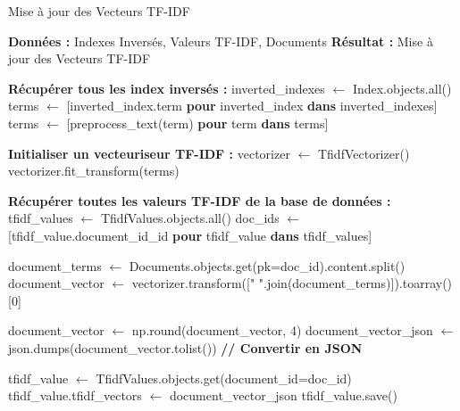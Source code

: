 \begin{algorithm}
    \caption{Mise à jour des Vecteurs TF-IDF}
    \begin{algorithmic}[1]
    \State \textbf{Données :} Indexes Inversés, Valeurs TF-IDF, Documents
    \State \textbf{Résultat :} Mise à jour des Vecteurs TF-IDF
    
    \State \textbf{Récupérer tous les index inversés :}
    \State inverted\_indexes $\leftarrow$ Index.objects.all()
    \State terms $\leftarrow$ [inverted\_index.term \textbf{pour} inverted\_index \textbf{dans} inverted\_indexes]
    \State terms $\leftarrow$ [preprocess\_text(term) \textbf{pour} term \textbf{dans} terms]
    
    \State \textbf{Initialiser un vecteuriseur TF-IDF :}
    \State vectorizer $\leftarrow$ TfidfVectorizer()
    \State vectorizer.fit\_transform(terms)
    
    \State \textbf{Récupérer toutes les valeurs TF-IDF de la base de données :}
    \State tfidf\_values $\leftarrow$ TfidfValues.objects.all()
    \State doc\_ids $\leftarrow$ [tfidf\_value.document\_id\_id \textbf{pour} tfidf\_value \textbf{dans} tfidf\_values]
    
        \State document\_terms $\leftarrow$ Documents.objects.get(pk=doc\_id).content.split()
        \State document\_vector $\leftarrow$ vectorizer.transform([" ".join(document\_terms)]).toarray()[0]
        
        \State document\_vector $\leftarrow$ np.round(document\_vector, 4)
        \State document\_vector\_json $\leftarrow$ json.dumps(document\_vector.tolist()) \textbf{  // Convertir en JSON}
        
        \State tfidf\_value $\leftarrow$ TfidfValues.objects.get(document\_id=doc\_id)
        \State tfidf\_value.tfidf\_vectors $\leftarrow$ document\_vector\_json
        \State tfidf\_value.save()
    \EndFor
    \end{algorithmic}
    \end{algorithm}
    
